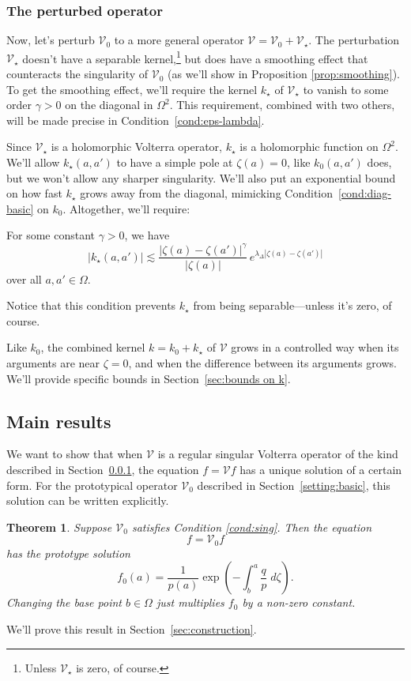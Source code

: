 \documentclass{article}
\makeatletter
\theoremstyle{plain}
\newtheorem{thm}{Theorem}
\newcommand{\condconst}[2]{\item[($\text{\textsc{#1}} \mid #2$)]\protected@edef\@currentlabel{$\text{\textsc{#1}} \mid #2$}}
\newcommand{\volterra}{\mathcal{V}}
\newcommand{\hardpart}{\mathcal{V}_0}
\newcommand{\softpart}{\mathcal{V}_\star}
\newcommand{\hardker}{k_0}
\newcommand{\softker}{k_\star}
\newcommand{\solproto}{f_0}
\newcommand{\domain}{\Omega}
\makeatother
\begin{document}
\subsubsection{The perturbed operator}\label{setting:perturbed}

Now, let's perturb $\hardpart$ to a more general operator $\volterra=\hardpart +\softpart$. The perturbation $\softpart$ doesn't have a separable kernel,\footnote{Unless $\softpart$ is zero, of course.} but does have a smoothing effect that counteracts the singularity of $\hardpart$ (as we'll show in Proposition \ref{prop:smoothing}). To get the smoothing effect, we'll require the kernel $\softker$ of $\softpart$ to vanish to some order $\gamma > 0$ on the diagonal in $\Omega^2$. This requirement, combined with two others, will be made precise in Condition~\eqref{cond:eps-lambda}.

Since $\softpart$ is a holomorphic Volterra operator, $\softker$ is a holomorphic function on $\domain^2$. We'll allow $\softker(a, a')$ to have a simple pole at $\zeta(a) = 0$, like $\hardker(a, a')$ does, but we won't allow any sharper singularity. We'll also put an exponential bound on how fast $\softker$ grows away from the diagonal, mimicking Condition~\eqref{cond:diag-basic} on $\hardker$. Altogether, we'll require:
\begin{conditions}
\condconst{diag$_\star$}{\gamma, \lambda_\Delta}\label{cond:eps-lambda} For some constant $\gamma > 0$, we have
\[ \big| \softker(a, a') \big| \lesssim\frac{|\zeta(a)-\zeta(a')|^\gamma}{|\zeta(a)|}\,e^{\lambda_\Delta|\zeta(a)-\zeta(a')|}\]
over all $a, a' \in \domain$.
\end{conditions}
Notice that this condition prevents $\softker$ from being separable---unless it's zero, of course.

Like $\hardker$, the combined kernel $k = \hardker + \softker$ of $\volterra$ grows in a controlled way when its arguments are near $\zeta = 0$, and when the difference between its arguments grows. We'll provide specific bounds in Section~\ref{sec:bounds on k}. 

\subsection{Main results}\label{sec:results}
We want to show that when $\volterra$ is a regular singular Volterra operator of the kind described in Section~\ref{setting:perturbed}, the equation $f = \volterra f$ has a unique solution of a certain form. For the prototypical operator $\hardpart$ described in Section~\ref{setting:basic}, this solution can be written explicitly.
\begin{thm}\label{thm:basic_volterra}
Suppose $\hardpart$ satisfies {\em Condition \eqref{cond:sing}}. Then the equation
\[ f = \hardpart f \]
has the {\em prototype solution}
\begin{equation}\label{eqn:test_solution}
\solproto(a) = \frac{1}{p(a)} \exp\left(-\int_{b}^{a}\frac{q}{p}\;d\zeta\right).
\end{equation}
Changing the base point $b \in \domain$ just multiplies $f_0$ by a non-zero constant.
\end{thm}
We'll prove this result in Section~\ref{sec:construction}.
\end{document}
